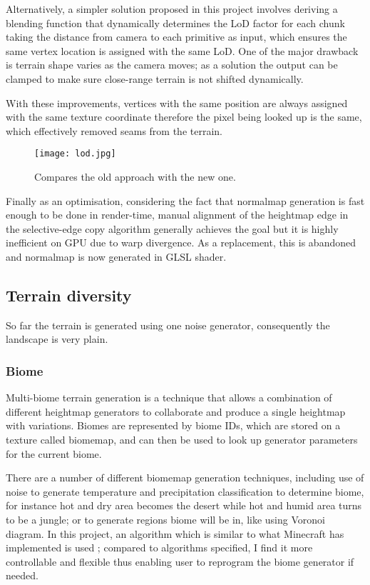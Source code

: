\documentclass[oneside, a4paper]{article}
\begin{document}
    Alternatively, a simpler solution proposed in this project involves deriving a blending function that dynamically determines the LoD factor for each chunk taking the distance from camera to each primitive as input, which ensures the same vertex location is assigned with the same LoD. One of the major drawback is terrain shape varies as the camera moves; as a solution the output can be clamped to make sure close-range terrain is not shifted dynamically.
    
    With these improvements, vertices with the same position are always assigned with the same texture coordinate therefore the pixel being looked up is the same, which effectively removed seams from the terrain.

    \begin{figure}[H]
        \texttt{[image: lod.jpg]}
        \caption{Compares the old approach with the new one.}
    \end{figure}
    
    Finally as an optimisation, considering the fact that normalmap generation is fast enough to be done in render-time, manual alignment of the heightmap edge in the selective-edge copy algorithm generally achieves the goal but it is highly inefficient on GPU due to warp divergence. As a replacement, this is abandoned and normalmap is now generated in GLSL shader.

    \subsection{Terrain diversity}

    So far the terrain is generated using one noise generator, consequently the landscape is very plain.

    \subsubsection{Biome}

    Multi-biome terrain generation is a technique that allows a combination of different heightmap generators to collaborate and produce a single heightmap with variations. Biomes are represented by biome IDs, which are stored on a texture called biomemap, and can then be used to look up generator parameters for the current biome.

    There are a number of different biomemap generation techniques, including use of noise to generate temperature and precipitation classification to determine biome, for instance hot and dry area becomes the desert while hot and humid area turns to be a jungle; or to generate regions biome will be in, like using Voronoi diagram. In this project, an algorithm which is similar to what Minecraft has implemented is used \cite{mc_biome}; compared to algorithms specified, I find it more controllable and flexible thus enabling user to reprogram the biome generator if needed.
\end{document}
